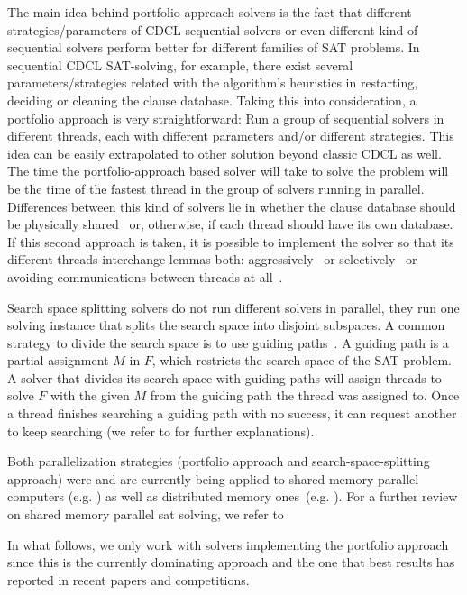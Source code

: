 The main idea behind portfolio approach solvers is the fact that
different strategies/parameters of CDCL sequential solvers or even 
different kind of sequential solvers
perform better for different families of SAT problems.  In sequential
CDCL SAT-solving, for example, there exist several parameters/strategies related
with the algorithm's heuristics in restarting, deciding
or cleaning the clause database. Taking this into consideration, a
portfolio approach is very straightforward: Run a group of sequential
solvers in different threads, each with different parameters and/or
different strategies. This idea can be easily extrapolated to other
solution beyond classic CDCL as well. 
The time the portfolio-approach based solver
will take to solve the problem will be the time of the fastest thread
in the group of solvers running in parallel.  Differences between this
kind of solvers lie in whether the clause database should be physically
shared~\cite{Sartagnan} or, otherwise, if each thread should have its
own database. If this second approach is taken, it is possible to implement 
the solver so that its different threads interchange lemmas 
both: aggressively~\cite{ManySAT} or
selectively~\cite{plingeling} or avoiding communications between
threads at all~\cite{ppfolio}.

Search space splitting solvers do not run different solvers in
parallel, they run one solving instance that splits the search space 
into disjoint subspaces. A common strategy
to divide the search space is to use guiding paths~\cite{psato}. A
guiding path is a partial assignment $M$ in $F$, which restricts the
search space of the SAT problem. A solver that divides its search
space with guiding paths will assign threads to solve $F$ with the
given $M$ from the guiding path the thread was assigned to. Once a
thread finishes searching a guiding path with no success, it can
request another to keep searching (we refer to \cite{paMiraXT} for
further explanations).

Both parallelization strategies (portfolio approach and
search-space-splitting approach) were and are currently being applied to
shared memory parallel computers (e.g. \cite{plingeling}) as well as
distributed memory ones~(e.g. \cite{paMiraXT}). For a further review
on shared memory parallel sat solving, we refer to \cite{survey-psolvers}

In what follows, we only work with solvers implementing the portfolio approach
since this is the currently dominating approach and the one that best
results has reported in recent papers and competitions.

